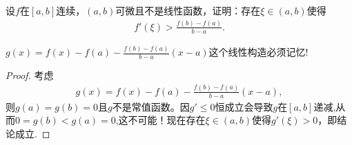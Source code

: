 \documentclass[../../main.tex]{subfiles}
\begin{document}
\begin{example}
设$f$在$[a,b]$连续，$(a,b)$可微且不是线性函数，证明：存在$\xi\in(a,b)$使得
\begin{align*}
f'(\xi) > \frac{f(b) - f(a)}{b - a}.
\end{align*}
\end{example}
\begin{note}
$g(x) = f(x) - f(a)- \frac{f(b) - f(a)}{b - a}(x - a)$这个线性构造必须记忆!
\end{note}
\begin{proof}
考虑
\begin{align*}
g(x) = f(x) - f(a)- \frac{f(b) - f(a)}{b - a}(x - a) ,
\end{align*}
则$g(a) = g(b) = 0$且$g$不是常值函数。因$g'\leq 0$恒成立会导致$g$在$[a,b]$递减,从而$0=g(b)<g(a)=0$,这不可能！现在存在$\xi\in(a,b)$使得$g'(\xi) > 0$，即结论成立.
\end{proof}
\end{document}
